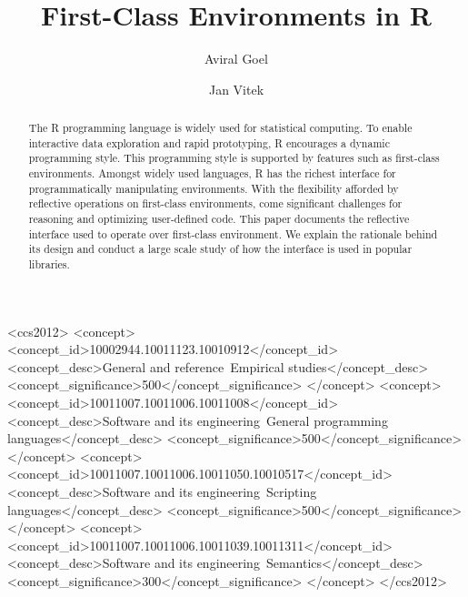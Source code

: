 \documentclass[10pt,review,sigplan,authorversion=true]{acmart}
\begin{document}
\title{First-Class Environments in R}
\author{Aviral Goel}
\author{Jan Vitek}
\authorsaddresses{}
\renewcommand{\shortauthors}{Goel, Vitek}


\begin{abstract}
  The R programming language is widely used for statistical computing. To enable
  interactive data exploration and rapid prototyping, R encourages a dynamic
  programming style. This programming style is supported by features such as
  first-class environments. Amongst widely used languages, R has the richest
  interface for programmatically manipulating environments. With the flexibility
  afforded by reflective operations on first-class environments, come
  significant challenges for reasoning and optimizing user-defined code. This
  paper documents the reflective interface used to operate over first-class
  environment. We explain the rationale behind its design and conduct a large
  scale study of how the interface is used in popular libraries.
\end{abstract}

\begin{CCSXML}
<ccs2012>
<concept>
<concept_id>10002944.10011123.10010912</concept_id>
<concept_desc>General and reference~Empirical studies</concept_desc>
<concept_significance>500</concept_significance>
</concept>
<concept>
<concept_id>10011007.10011006.10011008</concept_id>
<concept_desc>Software and its engineering~General programming languages</concept_desc>
<concept_significance>500</concept_significance>
</concept>
<concept>
<concept_id>10011007.10011006.10011050.10010517</concept_id>
<concept_desc>Software and its engineering~Scripting languages</concept_desc>
<concept_significance>500</concept_significance>
</concept>
<concept>
<concept_id>10011007.10011006.10011039.10011311</concept_id>
<concept_desc>Software and its engineering~Semantics</concept_desc>
<concept_significance>300</concept_significance>
</concept>
</ccs2012>
\end{CCSXML}


\end{document}
